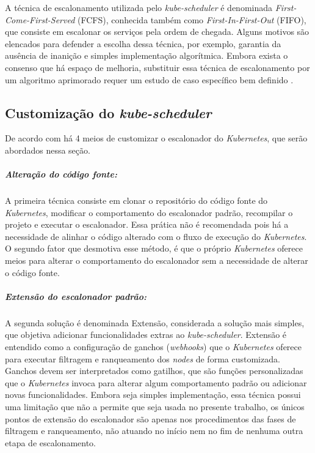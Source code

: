 A técnica de escalonamento utilizada pelo \textit{kube-scheduler} é denominada \textit{First-Come-First-Served} (FCFS), conhecida também como \textit{First-In-First-Out} (FIFO), que consiste em escalonar os serviços pela ordem de chegada. Alguns motivos são elencados para defender a escolha dessa técnica, por exemplo, garantia da ausência de inanição e simples implementação algorítmica. Embora exista o consenso que há espaço de melhoria, substituir essa técnica de escalonamento por um algoritmo aprimorado 
requer um estudo de caso específico bem definido \cite{CarastanSantos2019}.

\subsection{Customização do \textit{kube-scheduler}}
\label{customizacao_kube_scheduler}
De acordo com  há 4 meios de customizar o escalonador do \textit{Kubernetes}, que serão abordados nessa seção.

\subparagraph{Alteração do código fonte:}
A primeira técnica consiste em clonar o repositório do código fonte do \textit{Kubernetes}, modificar o comportamento do escalonador padrão, recompilar o projeto e executar o escalonador. Essa prática não é recomendada pois há a necessidade de alinhar o código alterado com o fluxo de execução do \textit{Kubernetes}. O segundo fator que desmotiva esse método, é que o próprio \textit{Kubernetes} oferece meios para alterar o comportamento do escalonador sem a necessidade de alterar o código fonte.

\subparagraph{Extensão do escalonador padrão:}
A segunda solução é denominada Extensão, considerada a solução mais simples, que objetiva adicionar funcionalidades extras ao \textit{kube-scheduler}. Extensão é entendido como a configuração de ganchos (\textit{webhooks}) que o \textit{Kubernetes} oferece para executar filtragem e ranqueamento dos \textit{nodes} de forma customizada. Ganchos devem ser interpretados como gatilhos, que são funções personalizadas que o \textit{Kubernetes} invoca para alterar algum comportamento padrão ou adicionar novas funcionalidades. Embora seja simples implementação, essa técnica possui uma limitação que não a permite que seja usada no presente trabalho, os únicos pontos de extensão do escalonador são apenas nos procedimentos das fases de filtragem e ranqueamento, não atuando no início nem no fim de nenhuma outra etapa de escalonamento. 

